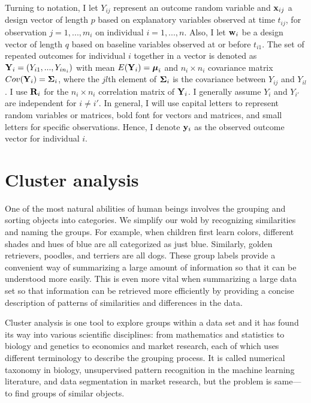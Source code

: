 Turning to notation, I let $Y_{ij}$ represent an outcome random variable and $\mathbf x_{ij}$ a design vector of length $p$ based on explanatory variables observed at time $t_{ij}$, for observation $j=1,...,m_{i}$ on individual $i=1,...,n$. Also, I let $\mathbf w_{i}$ be a design vector of length $q$ based on baseline variables observed at or before $t_{i1}$. The set of repeated outcomes for individual $i$ together in a vector is denoted as $\mathbf Y_{i} = (Y_{i1},...,Y_{in_{i}})$ with mean $E(\mathbf Y_{i}) = \boldsymbol\mu_{i}$ and $n_{i}\times n_{i}$ covariance matrix $Cov(\mathbf Y_{i}) = \boldsymbol\Sigma_{i}$, where the $jl$th element of $\boldsymbol\Sigma_{i}$ is the covariance between $Y_{ij}$ and $Y_{il}$. I use $\mathbf R_{i}$ for the $n_{i}\times n_{i}$ correlation matrix of $\mathbf Y_{i}$. I generally assume $Y_{i}$ and $Y_{i'}$ are independent for $i\not = i'$. In general, I will use capital letters to represent random variables or matrices, bold font for vectors and matrices, and small letters for specific observations. Hence, I denote $\mathbf y_{i}$ as the observed outcome vector for individual $i$. 

\section{Cluster analysis}
One of the most natural abilities of human beings involves the grouping and sorting objects into categories. We simplify our wold by recognizing similarities and naming the groups. For example, when children first learn colors, different shades and hues of blue are all categorized as just blue. Similarly, golden retrievers, poodles, and terriers are all dogs. These group labels provide a convenient way of summarizing a large amount of information so that it can be understood more easily. This is even more vital when summarizing a large data set so that information can be retrieved more efficiently by providing a concise description of patterns of similarities and differences in the data. 

Cluster analysis is one tool to explore groups within a data set and it has found its way into various scientific disciplines: from mathematics and statistics to biology and genetics to economics and market research, each of which uses different terminology to describe the grouping process. It is called numerical taxonomy in biology, unsupervised pattern recognition in the machine learning literature, and data segmentation in market research, but the problem is same---to find groups of similar objects.
 
